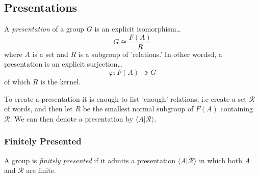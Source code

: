 \subsection{Presentations}\label{presentations}

A \emph{presentation} of a group $G$ is an explicit isomorphism\dots
$$G \cong \frac{F(A)}{R}$$
where $A$ is a set and $R$ is a subgroup of 'relations.' In other wordsd, a presentation is an explicit surjection\dots
$$\varphi : F(A) \twoheadrightarrow G$$
of which $R$ is the kernel. \newline

\noindent To create a presentation it is enough to list 'enough' relations, i.e create a set $\mathcal{R}$ of words, and then let
$R$ be the smallest normal subgroup of $F(A)$ containing $\mathcal{R}$. We can then denote a presentation by $\langle A | \mathcal{R} \rangle$.

\subsubsection{Finitely Presented}\label{finitelypresented}
A group is \emph{finitely presented} if it admits a presentation $\langle A | \mathcal{R} \rangle$ in which both $A$ and $\mathcal{R}$ are finite.
